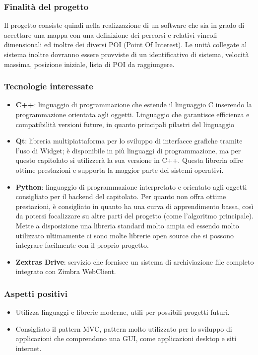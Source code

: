 		\subsubsection{Finalità del progetto}
			Il progetto consiste quindi nella realizzazione di un software che sia in grado di accettare una mappa con una definizione dei percorsi e relativi vincoli dimensionali ed inoltre dei diversi POI (Point Of Interest). Le unità collegate al sistema inoltre dovranno essere provviste di un identificativo di sistema, velocità massima, posizione iniziale, lista di POI da raggiungere.
		\subsubsection{Tecnologie interessate}
			\begin{itemize}
				\item\textbf{C++}: linguaggio di programmazione che estende il linguaggio C inserendo la programmazione orientata agli oggetti. Linguaggio che garantisce efficienza e compatibilità versioni future, in quanto principali pilastri del linguaggio
				\item\textbf{Qt}:  libreria multipiattaforma per lo sviluppo di interfacce grafiche tramite l’uso di Widget; è disponibile in più linguaggi di programmazione, ma per questo capitolato si utilizzerà la sua versione in C++. Questa libreria offre ottime prestazioni e supporta la maggior parte dei sistemi operativi.
				\item\textbf{Python}: linguaggio di programmazione interpretato e orientato agli oggetti consigliato per il backend del capitolato. Per quanto non offra ottime prestazioni, è consigliato in quanto ha una curva di apprendimento bassa, così da potersi focalizzare su altre parti del progetto (come l’algoritmo principale). Mette a disposizione una libreria standard molto ampia ed essendo molto utilizzato ultimamente ci sono molte librerie open source che si possono integrare facilmente con il proprio progetto.
				\item\textbf{Zextras Drive}: servizio che fornisce un sistema di archiviazione file completo integrato con Zimbra WebClient.
			\end{itemize}
			
		\subsubsection{Aspetti positivi}
			\begin{itemize}
				\item Utilizza linguaggi e librerie moderne, utili per possibili progetti futuri.
				\item Consigliato il pattern MVC, pattern molto utilizzato per lo sviluppo di applicazioni che comprendono una GUI, come applicazioni desktop e siti internet.
 			\end{itemize}			
